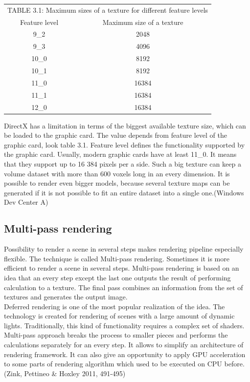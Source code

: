 \documentclass[twoside, english, 11pt]{report}
\begin{document}
\begin{table}[!h]
 \begin{center}
    \begin{tabular}{ c  c }
    \multicolumn{2}{l}{TABLE 3.1: Maximum sizes of a texture for different feature levels \label{tab:level}}\\
    Feature level & Maximum size of a texture\\
    \hline
    9\_2 & 2048\\
    9\_3 & 4096\\
    10\_0 & 8192\\
    10\_1 & 8192\\
    11\_0 & 16384\\
    11\_1 & 16384\\
    12\_0 & 16384\\
    \end{tabular}

  \end{center}
\end{table}
DirectX has a limitation in terms of the biggest available texture size, which can be loaded to the graphic card. The value depends from feature level of the graphic card, look table 3.1. Feature level defines the functionality supported by the graphic card. Usually, modern graphic cards have at least 11\_0. It means that they support up to 16 384 pixels per a side. Such a big texture can keep a volume dataset with more than 600 voxels long in an every dimension. It is possible to render even bigger models, because several texture maps can be generated if it is not possible to fit an entire dataset into a single one.(Windows Dev Center A)\\

\subsection{Multi-pass rendering}

Possibility to render a scene in several steps makes rendering pipeline especially flexible. The technique is called Multi-pass rendering. Sometimes it is more efficient to render a scene in several steps. Multi-pass rendering is based on an idea that an every step except the last one outputs the result of performing calculation to a texture. The final pass combines an information from the set of textures and generates the output image.\\

Deferred rendering is one of the most popular realization of the idea. The technology is created for rendering of scenes with a large amount of dynamic lights. Traditionally, this kind of functionality requires a complex set of shaders. Multi-pass approach breaks the process to smaller pieces and performs the calculations separately for an every step. It allows to simplify an architecture of rendering framework. It can also give an opportunity to apply GPU acceleration to some parts of rendering algorithm which used to be executed on CPU before.(Zink, Pettineo \& Hoxley 2011, 491-495)\\
\end{document}
